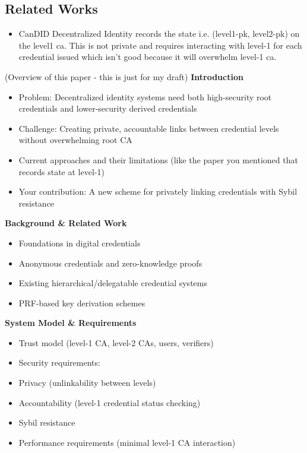 \subsection{Related Works}
\begin{itemize}
    \item CanDID Decentralized Identity records the state i.e. (level1-pk, level2-pk) on the level1 ca. This is not private and requires interacting with level-1 for each credential issued which isn't good because it will overwhelm level-1 ca.
    
\end{itemize}



(Overview of this paper - this is just for my draft)
\textbf{Introduction}
\begin{itemize}
    \item Problem: Decentralized identity systems need both high-security root credentials and lower-security derived credentials
    \item Challenge: Creating private, accountable links between credential levels without overwhelming root CA
    \item Current approaches and their limitations (like the paper you mentioned that records state at level-1)
    \item Your contribution: A new scheme for privately linking credentials with Sybil resistance
\end{itemize}



\noindent \textbf{Background \& Related Work}
\begin{itemize}
    \item Foundations in digital credentials
    \item Anonymous credentials and zero-knowledge proofs
    \item Existing hierarchical/delegatable credential systems
    \item PRF-based key derivation schemes
\end{itemize}


\noindent \textbf{System Model \& Requirements}
\begin{itemize}
    \item Trust model (level-1 CA, level-2 CAs, users, verifiers)
    \item Security requirements:
    \item Privacy (unlinkability between levels)
    \item Accountability (level-1 credential status checking)
    \item Sybil resistance
    \item Performance requirements (minimal level-1 CA interaction)
\end{itemize}


